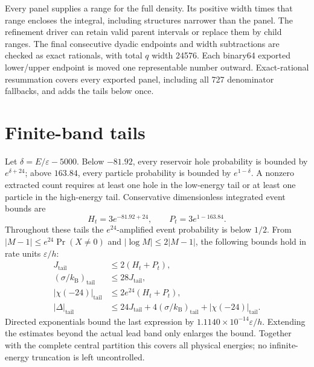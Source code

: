 \documentclass[11pt,a4paper]{article}
\newcommand{\kb}{k_{\mathrm B}}
\newcommand{\ee}{\varepsilon}
\begin{document}
Every panel supplies a range for the full density. Its positive width times
that range encloses the integral, including structures narrower than the
panel. The refinement driver can retain valid parent intervals or replace
them by child ranges. The final consecutive dyadic endpoints and width
subtractions are checked as exact rationals, with total $q$ width 24576.
Each binary64 exported lower/upper endpoint is moved one representable
number outward. Exact-rational resummation covers every exported panel,
including all 727 denominator fallbacks, and adds the tails below once.

\section{Finite-band tails}
\label{app:tails}

Let $\delta=E/\ee-5000$. Below $-81.92$, every reservoir hole probability
is bounded by $e^{\delta+24}$; above $163.84$, every particle probability
is bounded by $e^{1-\delta}$. A nonzero extracted count requires at least
one hole in the low-energy tail or at least one particle in the high-energy
tail. Conservative dimensionless integrated event bounds are
\begin{equation}
 H_t=3e^{-81.92+24},\qquad P_t=3e^{1-163.84}.
\end{equation}
Throughout these tails the $e^{24}$-amplified event probability is below
$1/2$. From $|M-1|\le e^{24}\Pr(X\ne0)$ and
$|\log M|\le2|M-1|$, the following bounds hold in rate units $\ee/h$:
\begin{align}
 J_{\mathrm{tail}}&\le2(H_t+P_t),\\
 (\sigma/\kb)_{\mathrm{tail}}&\le28J_{\mathrm{tail}},\\
 |\chi(-24)|_{\mathrm{tail}}&\le2e^{24}(H_t+P_t),\\
 |\Delta|_{\mathrm{tail}}&\le24J_{\mathrm{tail}}
       +4(\sigma/\kb)_{\mathrm{tail}}+|\chi(-24)|_{\mathrm{tail}}.
\end{align}
Directed exponentials bound the last expression by
$1.1140\times10^{-14}\ee/h$. Extending the estimates beyond the actual
lead band only enlarges the bound. Together with the complete central
partition this covers all physical energies; no infinite-energy truncation
is left uncontrolled.



\end{document}
